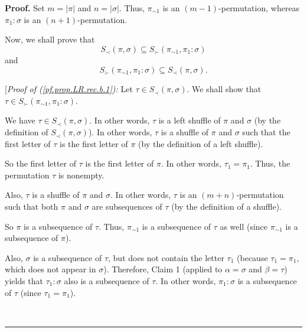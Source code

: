 \documentclass[numbers=enddot,12pt,final,onecolumn,notitlepage]{scrartcl}%
\theoremstyle{definition}
\newenvironment{proof}[1][Proof]{\noindent\textbf{#1.} }{\ \rule{0.5em}{0.5em}}
\newenvironment{verlong}{}{}
\begin{document}
\begin{verlong}
\begin{proof}
Set $m=\left\vert \pi\right\vert $ and $n=\left\vert \sigma\right\vert $.
Thus, $\pi_{\sim1}$ is an $\left(  m-1\right)  $-permutation, whereas $\pi
_{1}:\sigma$ is an $\left(  n+1\right)  $-permutation.

Now, we shall prove that%
\begin{equation}
S_{\prec}\left(  \pi,\sigma\right)  \subseteq S_{\succ}\left(  \pi_{\sim1}%
,\pi_{1}:\sigma\right)  \label{pf.prop.LR.rec.b.1}%
\end{equation}
and%
\begin{equation}
S_{\succ}\left(  \pi_{\sim1},\pi_{1}:\sigma\right)  \subseteq S_{\prec}\left(
\pi,\sigma\right)  . \label{pf.prop.LR.rec.b.2}%
\end{equation}


[\textit{Proof of (\ref{pf.prop.LR.rec.b.1}):} Let $\tau\in S_{\prec}\left(
\pi,\sigma\right)  $. We shall show that $\tau\in S_{\succ}\left(  \pi_{\sim
1},\pi_{1}:\sigma\right)  $.

We have $\tau\in S_{\prec}\left(  \pi,\sigma\right)  $. In other words, $\tau$
is a left shuffle of $\pi$ and $\sigma$ (by the definition of $S_{\prec
}\left(  \pi,\sigma\right)  $). In other words, $\tau$ is a shuffle of $\pi$
and $\sigma$ such that the first letter of $\tau$ is the first letter of $\pi$
(by the definition of a left shuffle).

So the first letter of $\tau$ is the first letter of $\pi$. In other words,
$\tau_{1}=\pi_{1}$. Thus, the permutation $\tau$ is nonempty.

Also, $\tau$ is a shuffle of $\pi$ and $\sigma$. In other words, $\tau$ is an
$\left(  m+n\right)  $-permutation such that both $\pi$ and $\sigma$ are
subsequences of $\tau$ (by the definition of a shuffle).

So $\pi$ is a subsequence of $\tau$. Thus, $\pi_{\sim1}$ is a
subsequence of $\tau$ as well (since $\pi_{\sim1}$ is a subsequence of $\pi$).

Also, $\sigma$ is a subsequence of $\tau$, but does not contain the
letter $\tau_{1}$ (because $\tau_{1}=\pi_{1}$, which does not appear in
$\sigma$). Therefore, Claim 1 (applied to $\alpha=\sigma$ and $\beta=\tau$)
yields that $\tau_{1}:\sigma$ also is a subsequence of $\tau$. In
other words, $\pi_{1}:\sigma$ is a subsequence of $\tau$ (since
$\tau_{1}=\pi_{1}$).


\end{proof}
\end{verlong}
\end{document}
